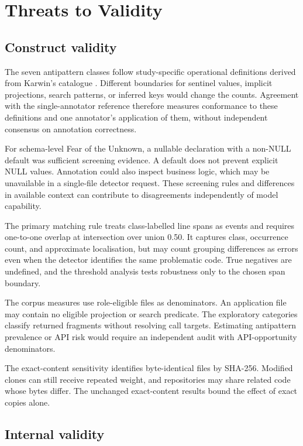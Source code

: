 \section{Threats to Validity}\label{sec:limitations}

\subsection{Construct validity}

The seven antipattern classes follow study-specific operational definitions derived from Karwin's catalogue . Different boundaries for sentinel values, implicit projections, search patterns, or inferred keys would change the counts. Agreement with the single-annotator reference therefore measures conformance to these definitions and one annotator's application of them, without independent consensus on annotation correctness.

For schema-level Fear of the Unknown, a nullable declaration with a non-NULL default was sufficient screening evidence. A default does not prevent explicit NULL values. Annotation could also inspect business logic, which may be unavailable in a single-file detector request. These screening rules and differences in available context can contribute to disagreements independently of model capability.

The primary matching rule treats class-labelled line spans as events and requires one-to-one overlap at intersection over union \num{0.50}. It captures class, occurrence count, and approximate localisation, but may count grouping differences as errors even when the detector identifies the same problematic code. True negatives are undefined, and the threshold analysis tests robustness only to the chosen span boundary.

The corpus measures use role-eligible files as denominators. An application file may contain no eligible projection or search predicate. The exploratory categories classify returned fragments without resolving call targets. Estimating antipattern prevalence or API risk would require an independent audit with API-opportunity denominators.

The exact-content sensitivity identifies byte-identical files by SHA-256. Modified clones can still receive repeated weight, and repositories may share related code whose bytes differ. The unchanged exact-content results bound the effect of exact copies alone.

\subsection{Internal validity}


